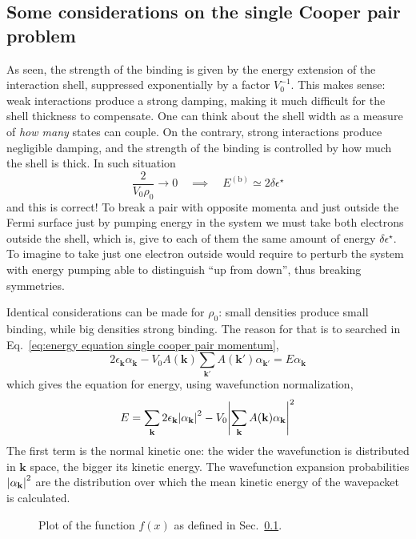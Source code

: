 \subsection{Some considerations on the single Cooper pair problem}\label{subsec:some considerations on the single Cooper pair problem}

As seen, the strength of the binding is given by the energy extension of the interaction shell, suppressed exponentially by a factor $V_0^{-1}$. This makes sense: weak interactions produce a strong damping, making it much difficult for the shell thickness to compensate. One can think about the shell width as a measure of \textit{how many} states can couple. On the contrary, strong interactions produce negligible damping, and the strength of the binding is controlled by how much the shell is thick.
In such situation
\[
	\frac{2}{V_0 \rho_0} \to 0
	\quad\implies\quad
	E^{(\mathrm{b})} \simeq 2\delta\epsilon^\star
\]
and this is correct! To break a pair with opposite momenta and just outside the Fermi surface just by pumping energy in the system we must take both electrons outside the shell, which is, give to each of them the same amount of energy $\delta\epsilon^\star$. To imagine to take just one electron outside would require to perturb the system with energy pumping able to distinguish ``up from down'', thus breaking symmetries.

Identical considerations can be made for $\rho_0$: small densities produce small binding, while big densities strong binding. The reason for that is to searched in Eq.~\eqref{eq:energy equation single cooper pair momentum},
\[
	2 \epsilon_\mathbf{k} \alpha_\mathbf{k} - V_0 A(\mathbf{k}) \sum_{\mathbf{k}'} A(\mathbf{k}') \alpha_{\mathbf{k}'} = E \alpha_\mathbf{k}
\]
which gives the equation for energy, using wavefunction normalization,
\begin{equation}\label{eq:energy equation single cooper pair probabilities}
	E = \sum_\mathbf{k} 2 \epsilon_\mathbf{k} \abs{\alpha_\mathbf{k}}^2 - V_0 \abs{\sum_\mathbf{k} A(\mathbf{k}) \alpha_\mathbf{k}}^2
\end{equation}
The first term is the normal kinetic one: the wider the wavefunction is distributed in $\mathbf{k}$ space, the bigger its kinetic energy. The wavefunction expansion probabilities $\abs{\alpha_\mathbf{k}}^2$ are the distribution over which the mean kinetic energy of the wavepacket is calculated. 

\begin{figure}
	\centering
	
	\caption{Plot of the function $f(x)$ as defined in Sec.~\ref{subsec:some considerations on the single Cooper pair problem}.}
	\label{fig:single cooper pair momentum distribution function}
\end{figure}

